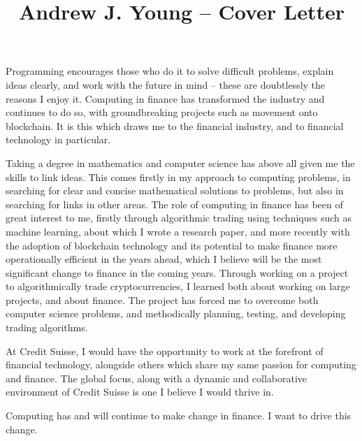 \documentclass[11pt]{article}
\begin{document}
\title{Andrew J. Young -- Cover Letter}
\maketitle

Programming encourages those who do it to solve difficult problems, explain ideas clearly, and work with the future in mind -- these are doubtlessly the reasons I enjoy it. Computing in finance has transformed the industry and continues to do so, with groundbreaking projects such as movement onto blockchain. It is this which draws me to the financial industry, and to financial technology in particular.

Taking a degree in mathematics and computer science has above all given me the skills to link ideas. This comes firstly in my approach to computing problems, in searching for clear and concise mathematical solutions to problems, but also in searching for links in other areas. The role of computing in finance has been of great interest to me, firstly through algorithmic trading using techniques such as machine learning, about which I wrote a research paper, and more recently with the adoption of blockchain technology and its potential to make finance more operationally efficient in the years ahead, which I believe will be the most significant change to finance in the coming years. Through working on a project to algorithmically trade cryptocurrencies, I learned both about working on large projects, and about finance. The project has forced me to overcome both computer science problems, and methodically planning, testing, and developing trading algorithms.

At Credit Suisse, I would have the opportunity to work at the forefront of financial technology, alongside others which share my same passion for computing and finance. The global focus, along with a dynamic and collaborative environment of Credit Suisse is one I believe I would thrive in.

Computing has and will continue to make change in finance. I want to drive this change.
\end{document}
